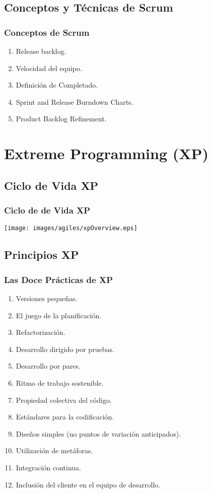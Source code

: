 \documentclass[animated,a4paper,slidestop,xcolor=pst,blue]{beamer}
\begin{document}
\subsection{Conceptos y Técnicas de Scrum}

\begin{frame}[c]
    \frametitle{Conceptos de Scrum}
    \begin{enumerate}[<+->]
        \item Release backlog.
        \item Velocidad del equipo.
        \item Definición de Completado.
        \item Sprint and Release Burndown Charts.
        \item Product Backlog Refinement.
    \end{enumerate}
\end{frame}

\section{Extreme Programming (XP)}

\subsection{Ciclo de Vida XP}

\begin{frame}[c]
	\frametitle{Ciclo de de Vida XP}
    \begin{center}
        \texttt{[image: images/agiles/xpOverview.eps]}
    \end{center}
\end{frame}

\subsection{Principios XP}

\begin{frame}[c]
	\frametitle{Las Doce Prácticas de XP}
    \begin{enumerate}[<+->]
        \item Versiones pequeñas.
        \item El juego de la planificación.
        \item Refactorización.
        \item Desarrollo dirigido por pruebas.
        \item Desarrollo por pares.
        \item Ritmo de trabajo sostenible.
        \item Propiedad colectiva del código.
        \item Estándares para la codificación.
        \item Diseños simples (no puntos de variación anticipados).
        \item Utilización de metáforas.
        \item Integración continua.
        \item Inclusión del cliente en el equipo de desarrollo.
    \end{enumerate}
\end{frame}
\end{document}
